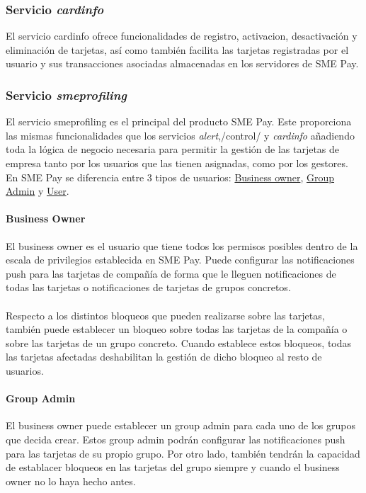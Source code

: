 \documentclass[a4paper, 12pt]{article}
\begin{document}
\subsubsection{Servicio \emph{cardinfo}}
\label{sec-3-1-4}
El servicio cardinfo ofrece funcionalidades de registro, activacion, desactivación y eliminación de tarjetas, así como también facilita las tarjetas registradas
por el usuario y sus transacciones asociadas almacenadas en los servidores de SME Pay.
\subsubsection{Servicio \emph{smeprofiling}}
\label{sec-3-1-5}
El servicio smeprofiling es el principal del producto SME Pay. Este proporciona las mismas funcionalidades que los servicios \emph{alert},/control/ y \emph{cardinfo} añadiendo toda la lógica de negocio necesaria
para permitir la gestión de las tarjetas de empresa tanto por los usuarios que las tienen asignadas, como por los gestores. En SME Pay se diferencia entre 3 tipos de usuarios: \hyperref[sec:bsowner]{Business owner}, \hyperref[sec:gadmin]{Group Admin}
y \hyperref[sec:user]{User}.
\paragraph{Business Owner}
\label{sec-3-1-5-1}
\label{sec:bsowner}
El business owner es el usuario que tiene todos los permisos posibles dentro de la escala de privilegios establecida en SME Pay. Puede configurar las notificaciones push para las tarjetas
de compañía de forma que le lleguen notificaciones de todas las tarjetas o notificaciones de tarjetas de grupos concretos.
\\
\\
Respecto a los distintos bloqueos que pueden realizarse sobre las tarjetas, también puede establecer un bloqueo sobre todas las tarjetas de la compañía o sobre las tarjetas de un grupo concreto. Cuando
establece estos bloqueos, todas las tarjetas afectadas deshabilitan la gestión de dicho bloqueo al resto de usuarios.
\paragraph{Group Admin}
\label{sec-3-1-5-2}
\label{sec:gadmin}
El business owner puede establecer un group admin para cada uno de los grupos que decida crear. Estos group admin podrán configurar las notificaciones push para las tarjetas de su propio grupo.
Por otro lado, también tendrán la capacidad de establacer bloqueos en las tarjetas del grupo siempre y cuando el business owner no lo haya hecho antes.
\end{document}
